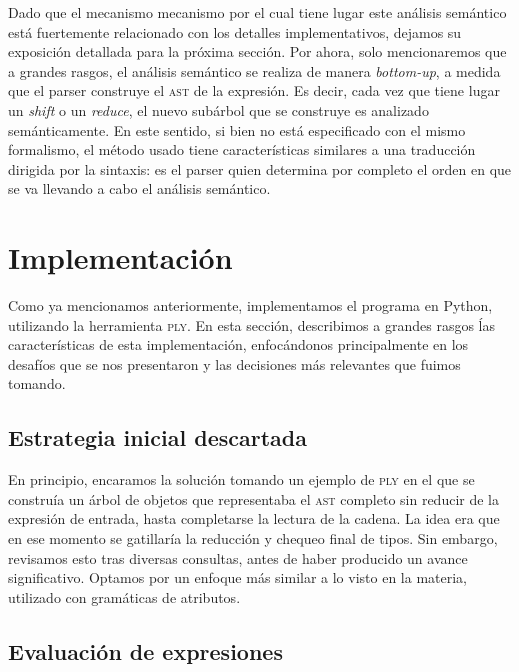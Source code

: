\documentclass[11pt]{article}
\begin{document}
Dado que el mecanismo mecanismo por el cual tiene lugar este análisis
semántico está fuertemente relacionado con los detalles implementativos,
dejamos su exposición detallada para la próxima sección.
Por ahora, solo mencionaremos que a grandes rasgos, el análisis semántico se
realiza de manera \emph{bottom-up}, a medida que el parser construye el
\textsc{ast} de la expresión.
Es decir, cada vez que tiene lugar un \emph{shift} o un \emph{reduce},
el nuevo subárbol que se construye es analizado semánticamente.
En este sentido, si bien no está especificado con el mismo formalismo, el
método usado tiene características similares a una traducción dirigida por la
sintaxis: es el parser quien determina por completo el orden en que
se va llevando a cabo el análisis semántico.


\section{Implementación}

Como ya mencionamos anteriormente, implementamos el programa en Python,
utilizando la herramienta \textsc{ply}. En esta sección, describimos a
grandes rasgos ĺas características de esta implementación, enfocándonos
principalmente en los desafíos que se nos presentaron y las decisiones más
relevantes que fuimos tomando.

\subsection{Estrategia inicial descartada}
En principio, encaramos la solución tomando un ejemplo de \textsc{ply} en el que se construía un árbol de objetos que representaba el \textsc{ast} completo sin reducir de la expresión de entrada, hasta completarse la lectura de la cadena. La idea era que en ese momento se gatillaría la reducción y chequeo final de tipos. Sin embargo, revisamos esto tras diversas consultas, antes de haber producido un avance significativo. Optamos por un enfoque más similar a lo visto en la materia, utilizado con gramáticas de atributos.

\subsection{Evaluación de expresiones}
\label{sec:reduccion}
\end{document}
